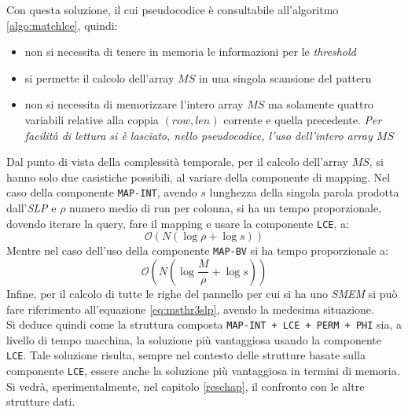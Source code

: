 Con questa soluzione, il cui pseudocodice è consultabile all'algoritmo
\ref{algo:matchlce}, quindi: 
\begin{itemize}
  \item non si necessita di tenere in memoria le informazioni per le
  \textit{threshold}
  \item si permette il calcolo dell'array $MS$ in una singola scansione del
  pattern 
  \item non si necessita di memorizzare l'intero array $MS$ ma solamente quattro
  variabili relative alla coppia
  $(row,len)$ corrente e quella precedente. \textit{Per facilità di lettura si è
  lasciato, nello pseudocodice, l'uso dell'intero array $MS$}
\end{itemize}
Dal punto di vista della complessità temporale, per il calcolo dell'array $MS$,
si hanno solo due casistiche 
possibili, al variare della componente di mapping. 
Nel caso della componente \texttt{MAP-INT}, avendo $s$ lunghezza della singola
parola prodotta dall'\textit{SLP} e $\rho$ numero medio di run per colonna, si
ha un tempo proporzionale, dovendo iterare la query, fare il mapping e usare la
componente \texttt{LCE}, a: 
\begin{equation}
  \label{eq:mslce1}
  \mathcal{O}(N(\log \rho+\log s))
\end{equation}
Mentre nel caso dell'uso della componente \texttt{MAP-BV} si ha tempo
proporzionale a:
\begin{equation}
  \label{eq:mslce2}
  \mathcal{O}\left(N\left(\log \frac{M}{\rho}+\log s\right)\right)
\end{equation}
Infine, per il calcolo di tutte le righe del pannello per cui si ha uno
\textit{SMEM} si può fare riferimento all'equazione \ref{eq:msthr3slp}, avendo
la medesima situazione.\\
Si deduce quindi come la struttura composta \texttt{MAP-INT + LCE + PERM + PHI}
sia, a 
livello di tempo macchina, la soluzione più vantaggiosa usando la componente
\texttt{LCE}. Tale soluzione risulta, sempre nel contesto delle strutture basate
sulla componente \texttt{LCE}, essere anche la soluzione più vantaggiosa in
termini di memoria.\\
Si vedrà, sperimentalmente, nel capitolo \ref{reschap}, il
confronto con le altre strutture dati.
